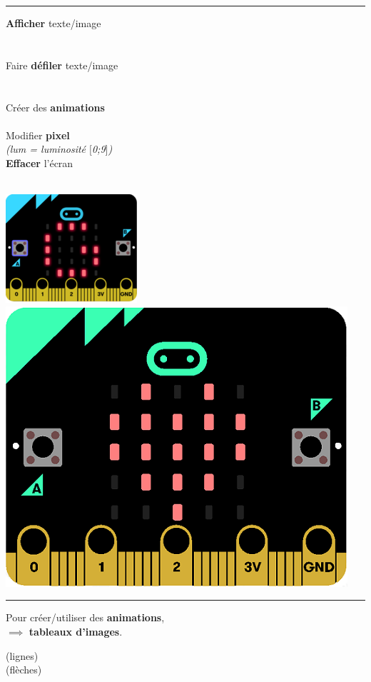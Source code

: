 \begin{minipage}[t]{0.6\linewidth}
	\begin{methode}[LED \mb]
		\rule{-0.25em}{2em}
		\textbf{Afficher} texte/image
		\hfill {}\\
		~\hfill \ex {}\\
		~\hfill \ex {}\\
		
		Faire \textbf{défiler} texte/image
		\hfill {}\\
		~\hfill \ex {}\\
		~\hfill \ex {}\\
		
		Créer des \textbf{animations}
		\hfill {}\\
		~\hfill \ex{}\\
		
		Modifier \textbf{pixel}
		\hfill {}\\
		\textit{\footnotesize (lum = luminosité $[$0;9$]$)}
		\hfill \ex {}\\
		
		\textbf{Effacer} l'écran
		\hfill {}\\
	\end{methode}
\end{minipage}
\hfill
\begin{minipage}[t]{0.4\linewidth}~\\[1.5em]
\hfill
\includegraphics[width=0.35\linewidth]{res/mb-fluctuations-illustration.png}
\hfill
\includegraphics[width=0.35\linewidth]{res/mbpy-init-heart.png}
\hfill~
\\[0em]
\begin{remarque}
	\rule{-0.25em}{1.7em}
	\hfill Pour créer/utiliser des \textbf{animations},\\
	\hfill $\implies$ \textbf{tableaux d'images}.
	
	\ex {} (lignes)\\
	\ex {} (flèches)\\
\end{remarque}	
\end{minipage}


